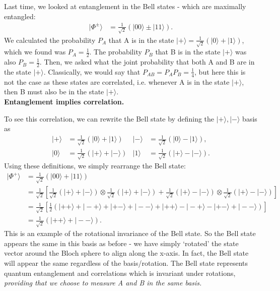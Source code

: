 \documentclass[lasers.tex]{subfiles}
\begin{document}
\chapter{}
Last time, we looked at entanglement in the Bell states - which are maximally entangled:
\begin{align}
    |\Phi^\pm\rangle &= \frac{1}{\sqrt{2}}\left(|00\rangle\pm|11\rangle\right).
\end{align}
We calculated the probability $P_A$ that A is in the state $|+\rangle=\frac{1}{\sqrt{2}}\left(|0\rangle+|1\rangle\right)$, which we found was $P_A=\frac12$.
The probability $P_B$ that B is in the state $|+\rangle$ was also $P_B=\frac12$.
Then, we asked what the joint probability that both A and B are in the state $|+\rangle$.
Classically, we would say that $P_{AB}=P_AP_B=\frac14$, but here this is not the case as these states are correlated, i.e. whenever A is in the state $|+\rangle$, then B must also be in the state $|+\rangle$.\\
\textbf{Entanglement implies correlation.}

To see this correlation, we can rewrite the Bell state by defining the $|+\rangle,|-\rangle$ basis as
\begin{align}
    |+\rangle &= \frac{1}{\sqrt{2}}\left(|0\rangle+|1\rangle\right) & |-\rangle &= \frac{1}{\sqrt{2}}\left(|0\rangle-|1\rangle\right), \\
    |0\rangle &= \frac{1}{\sqrt{2}}\left(|+\rangle+|-\rangle\right) & |1\rangle &= \frac{1}{\sqrt{2}}\left(|+\rangle-|-\rangle\right).
\end{align}
Using these definitions, we simply rearrange the Bell state:
\begin{align}
    |\Phi^+\rangle &= \frac{1}{\sqrt{2}}\left(|00\rangle+|11\rangle\right) \\
                   &= \frac{1}{\sqrt{2}}\left[\frac{1}{\sqrt{2}}\left(|+\rangle+|-\rangle\right)\otimes\frac{1}{\sqrt{2}}\left(|+\rangle+|-\rangle\right)+\frac{1}{\sqrt{2}}\left(|+\rangle-|-\rangle\right)\otimes\frac{1}{\sqrt{2}}\left(|+\rangle-|-\rangle\right)\right] \\
                   &= \frac{1}{\sqrt{2}}\left[\frac12\left(|++\rangle+|-+\rangle+|+-\rangle + |--\rangle + |++\rangle - |-+\rangle - |+-\rangle + |--\rangle\right)\right] \\
                   &= \frac{1}{\sqrt{2}}\left(|++\rangle+|--\rangle\right).
\end{align}
This is an example of the rotational invariance of the Bell state.
So the Bell state appears the same in this basis as before - we have simply `rotated' the state vector around the Bloch sphere to align along the x-axis. 
In fact, the Bell state will appear the same regardless of the basis/rotation. 
The Bell state represents quantum entanglement and correlations which is invariant under rotations, \emph{providing that we choose to measure A and B in the same basis.}
\end{document}
